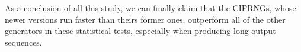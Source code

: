 As a conclusion of all this study, we can finally claim that the CIPRNGs, whose newer versions run faster than theirs former ones, outperform all of the other generators in these statistical tests, especially when producing long output sequences.



%
%
%
%
%
